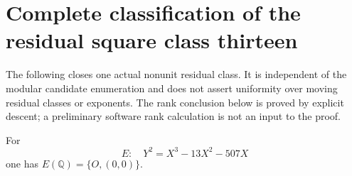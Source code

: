\section{Complete classification of the residual square class thirteen}
\label{q13-section}

The following closes one actual nonunit residual class. It is independent
of the modular candidate enumeration and does not assert uniformity over
moving residual classes or exponents. The rank conclusion below is proved
by explicit descent; a preliminary software rank calculation is not an
input to the proof.

\begin{lemma}\label{q13-group}
For
\[
 E:\quad Y^2=X^3-13X^2-507X
\]
one has $E(\mathbb Q)=\{O,(0,0)\}$.
\end{lemma}
